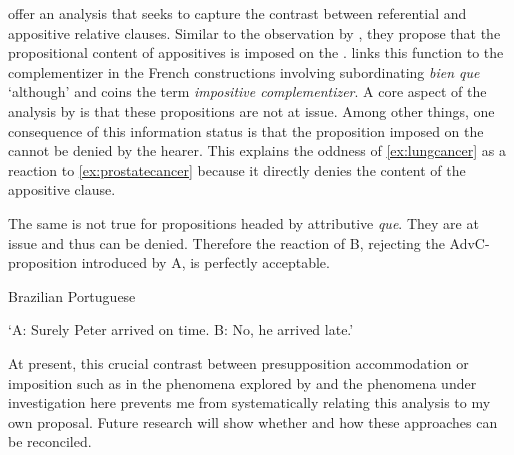 \citet{AnderBois2010, AnderBois2015} offer an analysis that seeks to  capture the contrast between referential and appositive relative clauses. Similar to the observation by \citet{Bianchi2017}, they propose that the propositional content of appositives is imposed on the . \citet{Lohiniva2017} links this function to the complementizer in the French constructions involving subordinating \emph{bien que} `although' and coins the term \emph{impositive complementizer}.   A core aspect of  the analysis by \citet{AnderBois2015} is that these propositions  are  not at issue. Among other things, one consequence of this information status is that the proposition imposed on the  cannot be denied by the hearer. This explains the  oddness of \eqref{ex:lungcancer} as a reaction to \eqref{ex:prostatecancer} because it directly denies the content of the appositive clause.
   
 
\ea{}
\z
\z


The same is not true for  propositions headed by attributive \emph{que}. They  are at issue and thus can be denied. Therefore the reaction of B,  rejecting the AdvC-proposition introduced by A, is perfectly acceptable. 
 
\ea\label{ex:atrasado}Brazilian Portuguese
\begin{xlist}
\end{xlist}
  \glt `A: Surely Peter arrived on time. B: No, he arrived late.'
 \z
 


At present, this crucial contrast between presupposition accommodation or imposition such as in  the phenomena explored by \citet{AnderBois2015} and the phenomena under investigation here prevents me from systematically relating  this analysis to my own proposal. Future research will show whether and how these  approaches can be reconciled. 





